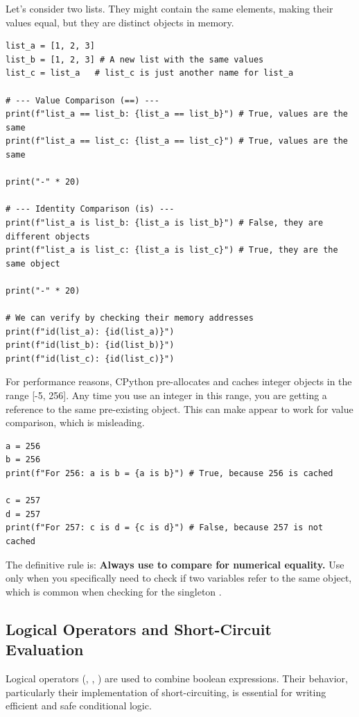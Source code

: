\begin{example}
Let's consider two lists. They might contain the same elements, making their values equal, but they are distinct objects in memory.
\text{ }\begin{verbatim}
list_a = [1, 2, 3]
list_b = [1, 2, 3] # A new list with the same values
list_c = list_a   # list_c is just another name for list_a

# --- Value Comparison (==) ---
print(f"list_a == list_b: {list_a == list_b}") # True, values are the same
print(f"list_a == list_c: {list_a == list_c}") # True, values are the same

print("-" * 20)

# --- Identity Comparison (is) ---
print(f"list_a is list_b: {list_a is list_b}") # False, they are different objects
print(f"list_a is list_c: {list_a is list_c}") # True, they are the same object

print("-" * 20)

# We can verify by checking their memory addresses
print(f"id(list_a): {id(list_a)}")
print(f"id(list_b): {id(list_b)}")
print(f"id(list_c): {id(list_c)}")
\end{verbatim}
\end{example}

\begin{remark}
For performance reasons, CPython pre-allocates and caches integer objects in the range [-5, 256]. Any time you use an integer in this range, you are getting a reference to the same pre-existing object. This can make  appear to work for value comparison, which is misleading.
\text{ }\begin{verbatim}
a = 256
b = 256
print(f"For 256: a is b = {a is b}") # True, because 256 is cached

c = 257
d = 257
print(f"For 257: c is d = {c is d}") # False, because 257 is not cached
\end{verbatim}
The definitive rule is: \textbf{Always use \code{==} to compare for numerical equality.} Use  only when you specifically need to check if two variables refer to the same object, which is common when checking for the singleton .
\end{remark}

\subsection{Logical Operators and Short-Circuit Evaluation}
\label{subsec:logical_operators}
Logical operators (, , ) are used to combine boolean expressions. Their behavior, particularly their implementation of short-circuiting, is essential for writing efficient and safe conditional logic.

